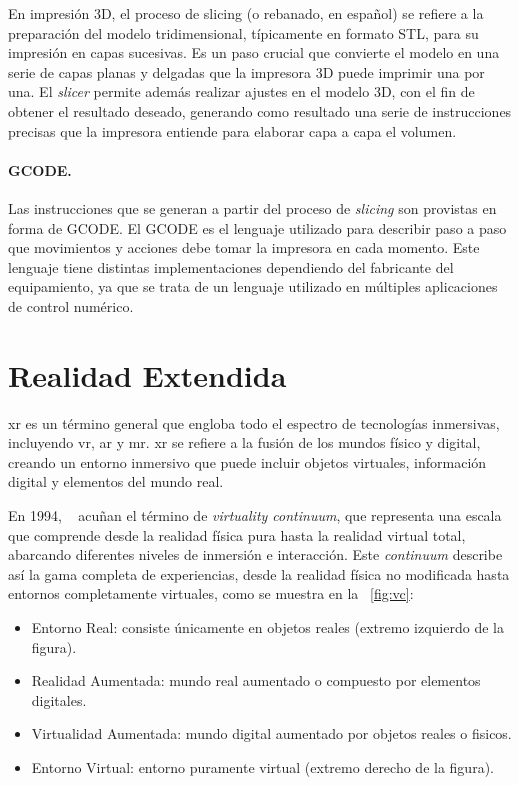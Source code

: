 En impresión 3D, el proceso de slicing (o rebanado, en español) se refiere a la preparación del modelo tridimensional, típicamente en formato STL, para su impresión en capas sucesivas. Es un paso crucial que convierte el modelo en una serie de capas planas y delgadas que la impresora 3D puede imprimir una por una.
El \emph{slicer} permite además realizar ajustes en el modelo 3D, con el fin de obtener el resultado deseado, generando como resultado una serie de instrucciones precisas que la impresora entiende para elaborar capa a capa el volumen.

\paragraph{GCODE.} Las instrucciones que se generan a partir del proceso de \emph{slicing} son provistas en forma de GCODE. El GCODE es el lenguaje utilizado para describir paso a paso que movimientos y acciones debe tomar la impresora en cada momento. Este lenguaje tiene distintas implementaciones dependiendo del fabricante del equipamiento, ya que se trata de un lenguaje utilizado en múltiples aplicaciones de control numérico.

\section{Realidad Extendida}

\acrfull{xr} es un término general que engloba todo el espectro de tecnologías inmersivas, incluyendo \acrfull{vr}, \acrfull{ar} y \acrfull{mr}. \acrshort{xr} se refiere a la fusión de los mundos físico y digital, creando un entorno inmersivo que puede incluir objetos virtuales, información digital y elementos del mundo real.

En 1994, \citeauthor{Milgram1994ATO}~\cite{Milgram1994ATO} acuñan el término de \emph{virtuality continuum}, que representa una escala que comprende desde la realidad física pura hasta la realidad virtual total, abarcando diferentes niveles de inmersión e interacción. Este \emph{continuum} describe así la gama completa de experiencias, desde la realidad física no modificada hasta entornos completamente virtuales, como se muestra en la \figurename~\ref{fig:vc}:
\begin{itemize}
	\item Entorno Real: consiste únicamente en objetos reales (extremo izquierdo de la figura).
	\item Realidad Aumentada: mundo real aumentado o compuesto por elementos digitales.
	\item Virtualidad Aumentada: mundo digital aumentado por objetos reales o fisicos.
	\item Entorno Virtual: entorno puramente virtual (extremo derecho de la figura).
\end{itemize}

